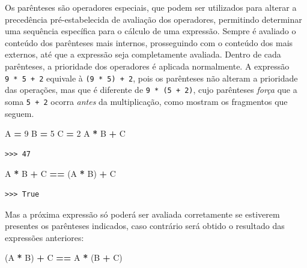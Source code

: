 \documentclass[
]{book}
\newenvironment{Shaded}{\begin{snugshade}}{\end{snugshade}}
\newcommand{\DecValTok}[1]{\textcolor[rgb]{0.00,0.00,0.81}{#1}}
\newcommand{\NormalTok}[1]{#1}
\newcommand{\OperatorTok}[1]{\textcolor[rgb]{0.81,0.36,0.00}{\textbf{#1}}}
\begin{document}
Os parênteses são operadores especiais, que podem ser utilizados para alterar a precedência pré-estabelecida de avaliação dos operadores, permitindo determinar uma sequência específica para o cálculo de uma expressão. Sempre é avaliado o conteúdo dos parênteses mais internos, prosseguindo com o conteúdo dos mais externos, até que a expressão seja completamente avaliada. Dentro de cada parênteses, a prioridade dos operadores é aplicada normalmente. A expressão \texttt{9\ *\ 5\ +\ 2} equivale à \texttt{(9\ *\ 5)\ +\ 2}, pois os parênteses não alteram a prioridade das operações, mas que é diferente de \texttt{9\ *\ (5\ +\ 2)}, cujo parênteses \emph{força} que a soma \texttt{5\ +\ 2} ocorra \emph{antes} da multiplicação, como mostram os fragmentos que seguem.

\begin{Shaded}
\begin{Highlighting}[]
\NormalTok{A }\OperatorTok{=} \DecValTok{9}
\NormalTok{B }\OperatorTok{=} \DecValTok{5}
\NormalTok{C }\OperatorTok{=} \DecValTok{2}
\NormalTok{A }\OperatorTok{*}\NormalTok{ B }\OperatorTok{+}\NormalTok{ C}
\end{Highlighting}
\end{Shaded}

\begin{verbatim}
>>> 47
\end{verbatim}

\begin{Shaded}
\begin{Highlighting}[]
\NormalTok{A }\OperatorTok{*}\NormalTok{ B }\OperatorTok{+}\NormalTok{ C }\OperatorTok{==}\NormalTok{ (A }\OperatorTok{*}\NormalTok{ B) }\OperatorTok{+}\NormalTok{ C}
\end{Highlighting}
\end{Shaded}

\begin{verbatim}
>>> True
\end{verbatim}

Mas a próxima expressão só poderá ser avaliada corretamente se estiverem presentes os parênteses indicados, caso contrário será obtido o resultado das expressões anteriores:

\begin{Shaded}
\begin{Highlighting}[]
\NormalTok{(A }\OperatorTok{*}\NormalTok{ B) }\OperatorTok{+}\NormalTok{ C }\OperatorTok{==}\NormalTok{ A }\OperatorTok{*}\NormalTok{ (B }\OperatorTok{+}\NormalTok{ C)}
\end{Highlighting}
\end{Shaded}
\end{document}
